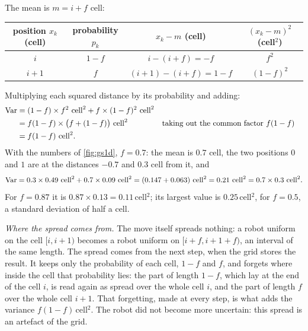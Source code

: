 The mean is $m=i+f$ cell:
\begin{center}
\begin{tabular}{cccc}
  \toprule
  position $x_k$ (cell) & probability $p_k$ & $x_k-m$ (cell) & $(x_k-m)^2$ (cell$^2$)\\
  \midrule
  $i$   & $1-f$ & $i-(i+f)=-f$    & $f^2$\\
  $i+1$ & $f$   & $(i+1)-(i+f)=1-f$ & $(1-f)^2$\\
  \bottomrule
\end{tabular}
\end{center}
Multiplying each squared distance by its probability and adding:
\begin{align*}
  \Var&=(1-f)\times f^2\ \text{cell}^2+f\times(1-f)^2\ \text{cell}^2\\
      &=f(1-f)\times\bigl(f+(1-f)\bigr)\ \text{cell}^2
       &&\text{taking out the common factor $f(1-f)$}\\
      &=f(1-f)\ \text{cell}^2 .
\end{align*}
With the numbers of \cref{fig:gs1d}, $f=0.7$: the mean is $0.7$ cell,
the two positions $0$ and $1$ are at the distances $-0.7$ and $0.3$ cell
from it, and
\[
  \Var=0.3\times0.49\ \text{cell}^2+0.7\times0.09\ \text{cell}^2
  =(0.147+0.063)\ \text{cell}^2=0.21\ \text{cell}^2=0.7\times0.3\ \text{cell}^2 .
\]
For $f=0.87$ it is $0.87\times0.13=0.11$\,cell$^2$; its largest value is
$0.25$\,cell$^2$, for $f=0.5$, a standard deviation of half a cell.

\emph{Where the spread comes from.} The move itself spreads nothing: a
robot uniform on the cell $[i,i+1)$ becomes a robot uniform on
$[i+f,i+1+f)$, an interval of the same length. The spread comes from the
next step, when the grid stores the result. It keeps only the
probability of each cell, $1-f$ and $f$, and forgets where inside the cell
that probability lies: the part of length $1-f$, which lay at the end of
the cell $i$, is read again as spread over the whole cell $i$, and the
part of length $f$ over the whole cell $i+1$. That forgetting, made at
every step, is what adds the variance $f(1-f)$\,cell$^2$. The robot did not become
more uncertain: this spread is an artefact of the grid.

